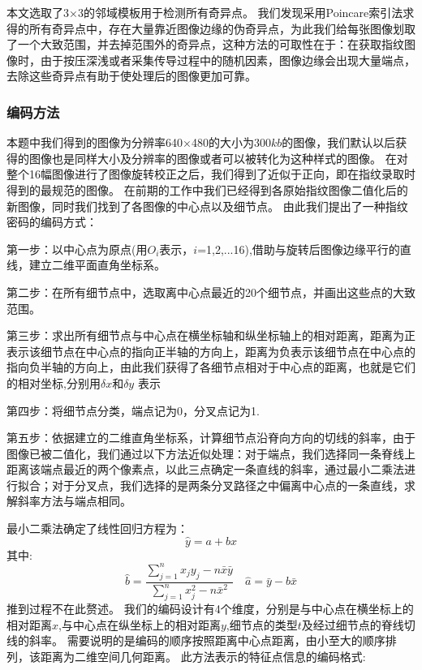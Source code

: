 \documentclass[withoutpreface,bwprint]{cumcmthesis} %
\begin{document}
本文选取了3×3的邻域模板用于检测所有奇异点。
我们发现采用Poincare索引法求得的所有奇异点中，存在大量靠近图像边缘的伪奇异点，为此我们给每张图像划取了一个大致范围，并去掉范围外的奇异点，这种方法的可取性在于：在获取指纹图像时，由于按压深浅或者采集传导过程中的随机因素，图像边缘会出现大量端点，去除这些奇异点有助于使处理后的图像更加可靠。

\subsubsection{编码方法}
本题中我们得到的图像为分辨率640×480的大小为300$kb$的图像，我们默认以后获得的图像也是同样大小及分辨率的图像或者可以被转化为这种样式的图像。
在对整个16幅图像进行了图像旋转校正之后，我们得到了近似于正向，即在指纹录取时得到的最规范的图像。  
在前期的工作中我们已经得到各原始指纹图像二值化后的新图像，同时我们找到了各图像的中心点以及细节点。
由此我们提出了一种指纹密码的编码方式：\par
第一步：以中心点为原点(用$O_{i}$表示，$i$=1,2,...16),借助与旋转后图像边缘平行的直线，建立二维平面直角坐标系。\par
第二步：在所有细节点中，选取离中心点最近的20个细节点，并画出这些点的大致范围。\par
第三步：求出所有细节点与中心点在横坐标轴和纵坐标轴上的相对距离，距离为正表示该细节点在中心点的指向正半轴的方向上，距离为负表示该细节点在中心点的指向负半轴的方向上，由此我们获得了各细节点相对于中心点的距离，也就是它们的相对坐标,分别用$\delta$$x$和$\delta$$y$ 表示\par
第四步：将细节点分类，端点记为0，分叉点记为1.\par
第五步：依据建立的二维直角坐标系，计算细节点沿脊向方向的切线的斜率，由于图像已被二值化，我们通过以下方法近似处理：对于端点，我们选择同一条脊线上距离该端点最近的两个像素点，以此三点确定一条直线的斜率，通过最小二乘法进行拟合；对于分叉点，我们选择的是两条分叉路径之中偏离中心点的一条直线，求解斜率方法与端点相同。\par
最小二乘法确定了线性回归方程为：$$\hat{y}=a+bx$$
其中:
\begin{equation}
\hat{b}=\frac{\sum_{j=1}^{n} x_{j} y_{j}-n \bar{x} \bar{y}}{\sum_{j=1}^{n} x_{j}^{2}-n \bar{x}^{2}} \quad
\hat{a}=\bar{y}-\hat{b} \bar{x}
\end{equation}
推到过程不在此赘述。
我们的编码设计有4个维度，分别是与中心点在横坐标上的相对距离$x$,与中心点在纵坐标上的相对距离$y$,细节点的类型$t$及经过细节点的脊线切线的斜率。
需要说明的是编码的顺序按照距离中心点距离，由小至大的顺序排列，该距离为二维空间几何距离。
此方法表示的特征点信息的编码格式: 
\par 
\end{document}
